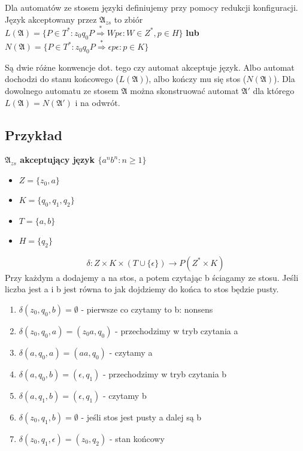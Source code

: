 \documentclass{../notatki}
\begin{document}
Dla automatów ze stosem języki definiujemy przy pomocy redukcji konfiguracji.
Język akceptowany przez $\mathfrak{A}_{zs}$ to zbiór
$L(\mathfrak{A})=\{P \in T^* : z_0q_0P \stackrel{*}{\Rightarrow}
Wp\epsilon : W \in Z^*, p \in H\}$
\textbf{lub} $N(\mathfrak{A})=\{P \in T^* : z_0q_0P
\stackrel{*}{\Rightarrow} \epsilon p \epsilon : p \in K\}$

Są dwie różne konwencje dot. tego czy automat akceptuje język. Albo automat
dochodzi do stanu końcowego ($L(\mathfrak{A})$), albo kończy mu się
stos ($N(\mathfrak{A})$). Dla dowolnego automatu ze stosem $\mathfrak{A}$ można
skonstruować automat $\mathfrak{A}'$ dla którego
$L(\mathfrak{A})=N(\mathfrak{A}')$ i na odwrót.

\subsection{Przykład}

\textbf{$\mathfrak{A}_{zs}$ akceptujący język $\{a^nb^n : n \ge 1\}$}

\begin{itemize}
  \item $Z = \{z_0, a\}$
  \item $K = \{q_0, q_1, q_2\}$
  \item $T = \{a, b\}$
  \item $H = \{q_2\}$
\end{itemize}

$$
\delta: Z \times K \times (T \cup \{\epsilon\}) \rightarrow P(Z^* \times K)
$$
Przy każdym a dodajemy a na stos, a potem czytając b ściagamy ze stosu. Jeśli
liczba jest a i b jest równa to jak dojdziemy do końca to stos będzie pusty.

\begin{enumerate}
  \item $\delta(z_0, q_0, b) = \emptyset$ - pierwsze co czytamy to b: nonsens
  \item $\delta(z_0, q_0, a) = (z_0a, q_0)$ - przechodzimy w tryb czytania a
  \item $\delta(a, q_0, a) = (aa, q_0)$ - czytamy a
  \item $\delta(a, q_0, b) = (\epsilon, q_1)$ - przechodzimy w tryb czytania b
  \item $\delta(a, q_1, b) = (\epsilon, q_1)$ - czytamy b
  \item $\delta(z_0, q_1, b) = \emptyset$ - jeśli stos jest pusty a dalej są b
  \item $\delta(z_0, q_1, \epsilon) = (z_0, q_2)$ - stan końcowy
\end{enumerate}
\end{document}
